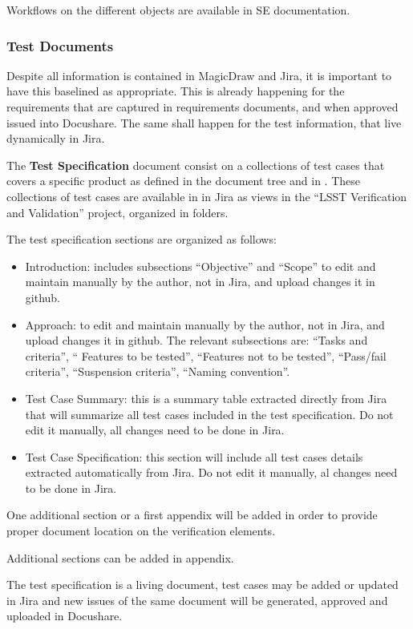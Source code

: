 Workflows on the different objects are available in SE documentation.


\subsubsection{Test Documents}

Despite all information is contained in MagicDraw and Jira, it is important to have this baselined as appropriate. This is already happening for the requirements that are captured in requirements documents, and when approved issued into Docushare.
The same shall happen for the test information, that live dynamically in Jira.

The {\bf Test Specification} document consist on a collections of test cases that covers a specific \product{} product as defined in the document tree and in . 
These collections of test cases are available in in Jira as views in the ``LSST Verification and Validation'' project, organized in folders.

The test specification sections are organized as follows:

\begin{itemize}
\item Introduction: includes subsections ``Objective'' and ``Scope'' to edit and maintain manually by the author, not in Jira, and upload changes it in github.
\item Approach: to edit and maintain manually by the author, not in Jira, and upload changes it in github. The relevant subsections are: ``Tasks and criteria'', `` Features to be tested'', ``Features not to be tested'', ``Pass/fail criteria'', ``Suspension criteria'', ``Naming convention''.
\item Test Case Summary: this is a summary table extracted directly from Jira that will summarize all test cases included in the test specification. Do not edit it manually, all changes need to be done in Jira.
\item Test Case Specification: this section will include all test cases details extracted automatically from Jira. Do not edit it manually, al changes need to be done in Jira.
\end{itemize}

One additional section or a first appendix will be added in order to provide proper document location on the verification elements.

Additional sections can be added in appendix.

The test specification is a living document, test cases may be added or updated in Jira and new issues of the same document will be generated, approved and uploaded in Docushare.

